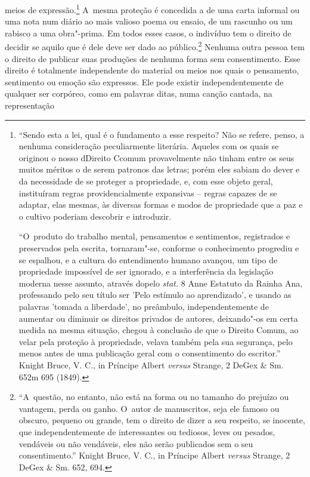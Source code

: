 meios de expressão.\footnote{``Sendo esta a lei, qual é o fundamento a
  esse respeito? Não se refere, penso, a nenhuma consideração
  peculiarmente literária. Aqueles com os quais se originou o nosso
  dDireito Ccomum provavelmente não tinham entre os seus muitos méritos
  o de serem patronos das letras; porém eles sabiam do dever e da
  necessidade de se proteger a propriedade, e, com esse objeto geral,
  instituíram regras providencialmente expansivas -- regras capazes de
  se adaptar, elas mesmas, às diversas formas e modos de propriedade que
  a paz e o cultivo poderiam descobrir e introduzir.

  ``O~produto do trabalho mental, pensamentos e sentimentos, registrados
  e preservados pela escrita, tornaram"-se, conforme o conhecimento
  progrediu e se espalhou, e a cultura do entendimento humano avançou,
  um tipo de propriedade impossível de ser ignorado, e a interferência
  da legislação moderna nesse assunto, através dopelo \emph{stat.} 8
  Anne Estatuto da Rainha Ana, professando pelo seu título ser 'Pelo
  estímulo ao aprendizado', e usando as palavras 'tomada a liberdade',
  no preâmbulo, independentemente de aumentar ou diminuir os direitos
  privados de autores, deixando"-os em certa medida na mesma situação,
  chegou à conclusão de que o Direito Comum, ao velar pela proteção à
  propriedade, velava também pela sua segurança, pelo menos antes de uma
  publicação geral com o consentimento do escritor.'' Knight Bruce, V.
  C., in Príncipe Albert \emph{versus} Strange, 2 DeGex \& Sm. 652m 695
  (1849).} A~mesma proteção é concedida a de uma carta informal ou uma
nota num diário ao mais valioso poema ou ensaio, de um rascunho ou um
rabisco a uma obra"-prima. Em todos esses casos, o indivíduo tem o
direito de decidir se aquilo que é dele deve ser dado ao
público.\footnote{``A~questão, no entanto, não está na forma ou no
  tamanho do prejuízo ou vantagem, perda ou ganho. O~autor de
  manuscritos, seja ele famoso ou obscuro, pequeno ou grande, tem o
  direito de dizer a seu respeito, se inocente, que independentemente de
  interessantes ou tediosos, leves ou pesados, vendáveis ou não
  vendáveis, eles não serão publicados sem o seu consentimento.'' Knight
  Bruce, V. C., in Príncipe Albert \emph{versus} Strange, 2 DeGex \& Sm.
  652, 694.} Nenhuma outra pessoa tem o direito de publicar suas
produções de nenhuma forma sem consentimento. Esse direito é totalmente
independente do material ou meios nos quais o pensamento, sentimento ou
emoção são expressos. Ele pode existir independentemente de qualquer ser
corpóreo, como em palavras ditas, numa canção cantada, na representação
